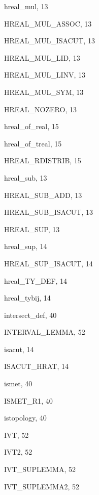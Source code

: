 \begin{theindex}
  \item {\ptt hreal\_mul}, 13
  \item {\ptt HREAL\_MUL\_ASSOC}, 13
  \item {\ptt HREAL\_MUL\_ISACUT}, 13
  \item {\ptt HREAL\_MUL\_LID}, 13
  \item {\ptt HREAL\_MUL\_LINV}, 13
  \item {\ptt HREAL\_MUL\_SYM}, 13
  \item {\ptt HREAL\_NOZERO}, 13
  \item {\ptt hreal\_of\_real}, 15
  \item {\ptt hreal\_of\_treal}, 15
  \item {\ptt HREAL\_RDISTRIB}, 15
  \item {\ptt hreal\_sub}, 13
  \item {\ptt HREAL\_SUB\_ADD}, 13
  \item {\ptt HREAL\_SUB\_ISACUT}, 13
  \item {\ptt HREAL\_SUP}, 13
  \item {\ptt hreal\_sup}, 14
  \item {\ptt HREAL\_SUP\_ISACUT}, 14
  \item {\ptt hreal\_TY\_DEF}, 14
  \item {\ptt hreal\_tybij}, 14

  \indexspace

  \item {\ptt intersect\_def}, 40
  \item {\ptt INTERVAL\_LEMMA}, 52
  \item {\ptt isacut}, 14
  \item {\ptt ISACUT\_HRAT}, 14
  \item {\ptt ismet}, 40
  \item {\ptt ISMET\_R1}, 40
  \item {\ptt istopology}, 40
  \item {\ptt IVT}, 52
  \item {\ptt IVT2}, 52
  \item {\ptt IVT\_SUPLEMMA}, 52
  \item {\ptt IVT\_SUPLEMMA2}, 52

  \indexspace


\end{theindex}
